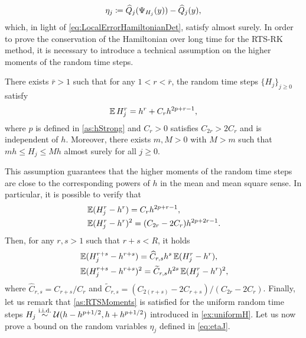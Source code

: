 \documentclass[10pt]{article}
\begin{document}
\begin{equation}\label{eq:etaJ}
	\eta_j \coloneqq \widehat Q_j(\Psi_{H_j}(y)) - \widehat Q_j(y),
\end{equation} 
which, in light of \eqref{eq:LocalErrorHamiltonianDet}, satisfy 
almost surely. In order to prove the conservation of the Hamiltonian over long time for the RTS-RK method, it is necessary to introduce a technical assumption on the higher moments of the random time steps.
\begin{assumption}\label{as:RTSMoments} There exists $\bar r > 1$ such that for any $1 < r < \bar r$, the random time steps $\{H_j\}_{j\geq 0}$ satisfy
	\begin{equation}
	\operatorname{\mathbb{E}} H_j^r = h^r + C_rh^{2p+r-1},
	\end{equation}
	where $p$ is defined in \cref{as:hStrong} and $C_r > 0$ satisfies $C_{2r} > 2C_r$ and is independent of $h$. Moreover, there exists $m, M > 0$ with $M > m$ such that $mh \leq H_j \leq Mh$ almost surely for all $j \geq 0$.
\end{assumption}
This assumption guarantees that the higher moments of the random time steps are close to the corresponding powers of $h$ in the mean and mean square sense. In particular, it is possible to verify that
\begin{equation}
\begin{aligned}
	&\operatorname{\mathbb{E}}(H_j^r - h^r) = C_r h^{2p+r-1},\\
	&\operatorname{\mathbb{E}}(H_j^r - h^r)^2 = (C_{2r} - 2C_r) h^{2p+2r-1}.
\end{aligned}
\end{equation}
Then, for any $r, s > 1$ such that $r + s < R$, it holds
\begin{equation}\label{eq:higherHigherMoments}
\begin{aligned}
	&\operatorname{\mathbb{E}}(H_j^{r+s} - h^{r+s}) = \widehat C_{r,s} h^s \operatorname{\mathbb{E}}(H_j^r - h^r),\\
	&\operatorname{\mathbb{E}}(H_j^{r+s} - h^{r+s})^2 = \widetilde C_{r,s} h^{2s} \operatorname{\mathbb{E}}(H_j^r - h^r)^2,
\end{aligned}
\end{equation}
where $\hat C_{r,s} = C_{r+s}/C_r$ and $\tilde C_{r,s} = (C_{2(r+s)} - 2C_{r+s})/(C_{2r} - 2C_r)$. Finally, let us remark that \cref{as:RTSMoments} is satisfied for the uniform random time steps $H_j \stackrel{\text{i.i.d.}}{\sim} \mathcal U(h-h^{p+1/2}, h+h^{p+1/2})$ introduced in \cref{ex:uniformH}. Let us now prove a bound on the random variables $\eta_j$ defined in \eqref{eq:etaJ}.
\end{document}
